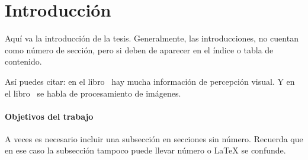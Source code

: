\chapter*{Introducción}

Aquí va la introducción de la tesis.
Generalmente, las introducciones, no cuentan como número de sección, pero si deben de aparecer en el índice o tabla de contenido.

Así puedes citar: en el libro~\cite{Hagen:vista} hay mucha información de percepción visual. Y en el libro~\cite{Gonzalez:ImagenesDigitales} se habla de procesamiento de imágenes.

\subsubsection*{Objetivos del trabajo}

A veces es necesario incluir una subsección en secciones sin número.
Recuerda que en ese caso la subsección tampoco puede llevar número o \LaTeX{} se confunde.

